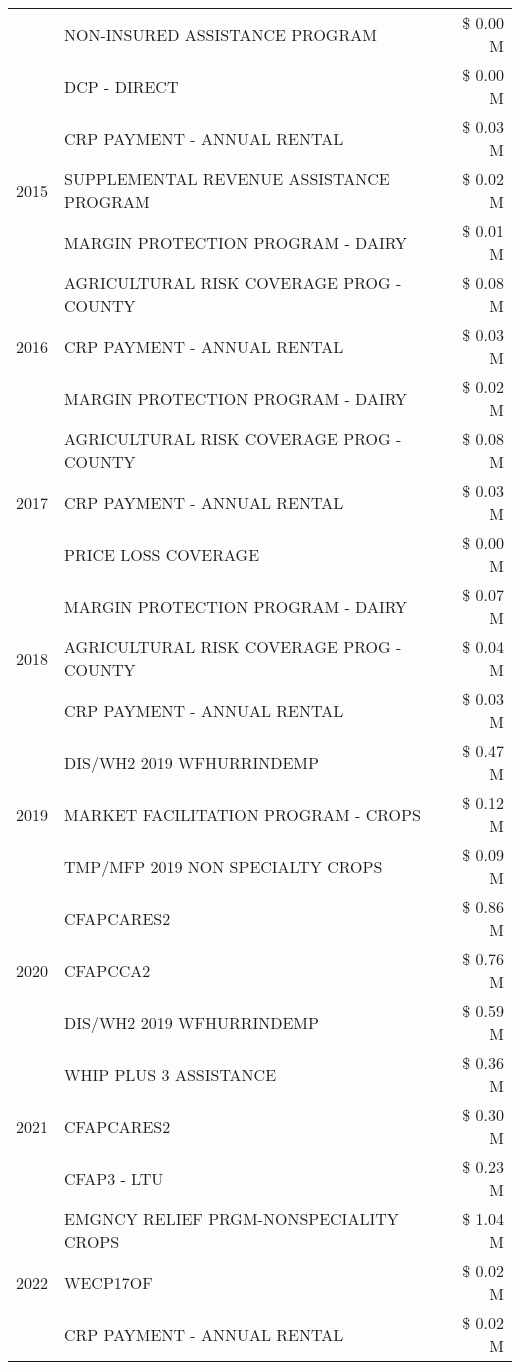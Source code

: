 \begin{tabular}{llr}
 & NON-INSURED ASSISTANCE PROGRAM & \$ 0.00 M \\
 & DCP - DIRECT & \$ 0.00 M \\
\cline{1-3}
\multirow[t]{3}{*}{2015} & CRP PAYMENT - ANNUAL RENTAL & \$ 0.03 M \\
 & SUPPLEMENTAL REVENUE ASSISTANCE PROGRAM & \$ 0.02 M \\
 & MARGIN PROTECTION PROGRAM - DAIRY & \$ 0.01 M \\
\cline{1-3}
\multirow[t]{3}{*}{2016} & AGRICULTURAL RISK COVERAGE PROG - COUNTY & \$ 0.08 M \\
 & CRP PAYMENT - ANNUAL RENTAL & \$ 0.03 M \\
 & MARGIN PROTECTION PROGRAM - DAIRY & \$ 0.02 M \\
\cline{1-3}
\multirow[t]{3}{*}{2017} & AGRICULTURAL RISK COVERAGE PROG - COUNTY & \$ 0.08 M \\
 & CRP PAYMENT - ANNUAL RENTAL & \$ 0.03 M \\
 & PRICE LOSS COVERAGE & \$ 0.00 M \\
\cline{1-3}
\multirow[t]{3}{*}{2018} & MARGIN PROTECTION PROGRAM - DAIRY & \$ 0.07 M \\
 & AGRICULTURAL RISK COVERAGE PROG - COUNTY & \$ 0.04 M \\
 & CRP PAYMENT - ANNUAL RENTAL & \$ 0.03 M \\
\cline{1-3}
\multirow[t]{3}{*}{2019} & DIS/WH2 2019 WFHURRINDEMP & \$ 0.47 M \\
 & MARKET FACILITATION PROGRAM - CROPS & \$ 0.12 M \\
 & TMP/MFP 2019 NON SPECIALTY CROPS & \$ 0.09 M \\
\cline{1-3}
\multirow[t]{3}{*}{2020} & CFAPCARES2 & \$ 0.86 M \\
 & CFAPCCA2 & \$ 0.76 M \\
 & DIS/WH2 2019 WFHURRINDEMP & \$ 0.59 M \\
\cline{1-3}
\multirow[t]{3}{*}{2021} & WHIP PLUS 3 ASSISTANCE & \$ 0.36 M \\
 & CFAPCARES2 & \$ 0.30 M \\
 & CFAP3 - LTU & \$ 0.23 M \\
\cline{1-3}
\multirow[t]{3}{*}{2022} & EMGNCY RELIEF PRGM-NONSPECIALITY CROPS & \$ 1.04 M \\
 & WECP17OF & \$ 0.02 M \\
 & CRP PAYMENT - ANNUAL RENTAL & \$ 0.02 M \\
\cline{1-3}
\bottomrule
\end{tabular}
